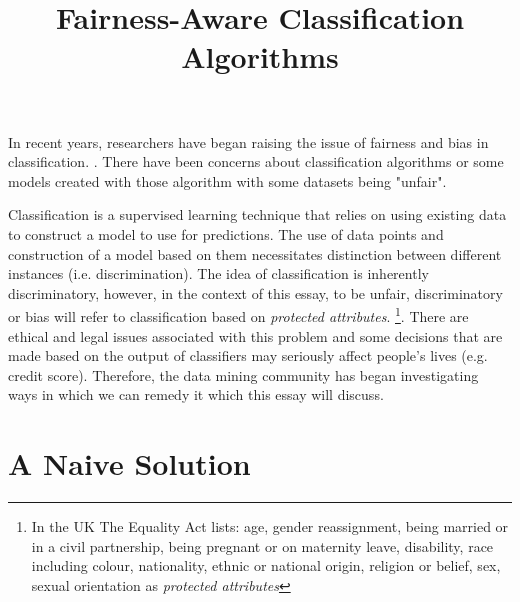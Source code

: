 \documentclass[a4paper, 12pt, notitlepage]{article}
\date{} %
\author{}
\title{Fairness-Aware Classification Algorithms}
\begin{document}
\maketitle

\vspace{-0.85cm}

In recent years, researchers have began raising the issue of fairness and bias in classification. \cite{pedreshi2008}. There have been concerns about classification algorithms or some models created with those algorithm with some datasets being "unfair".

Classification is a supervised learning technique that relies on using existing data to construct a model to use for predictions. The use of data points and construction of a model based on them necessitates distinction between different instances (i.e. discrimination). The idea of classification is inherently discriminatory, however, in the context of this essay, to be unfair, discriminatory or bias will refer to classification based on \emph{protected attributes}. \footnote{In the UK The Equality Act lists: age, gender reassignment, being married or in a civil partnership, being pregnant or on maternity leave, disability, race including colour, nationality, ethnic or national origin, religion or belief, sex, sexual orientation as \emph{protected attributes}}. There are ethical and legal issues associated with this problem and some decisions that are made based on the output of classifiers may seriously affect people's lives (e.g. credit score). Therefore, the data mining community has began investigating ways in which we can remedy it which this essay will discuss.



\section*{A Naive Solution}
\end{document}
